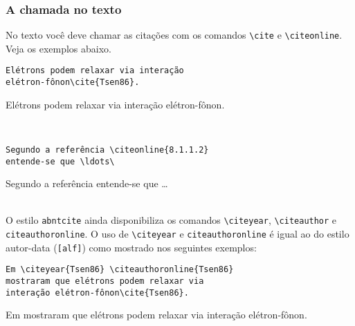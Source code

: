 \documentclass[espacosimples]{abnt}
\begin{document}
\subsubsection{A chamada no texto}

No texto você deve chamar as citações com os comandos \verb+\cite+ e
\verb+\citeonline+. Veja os exemplos abaixo.

\noindent\begin{minipage}[t]{10cm}\small
\begin{verbatim}
Elétrons podem relaxar via interação
elétron-fônon\cite{Tsen86}.
\end{verbatim}\end{minipage}\begin{minipage}[t]{7cm}\small
Elétrons podem relaxar via interação elétron-fônon\cite{Tsen86}.
\end{minipage}\vspace{5mm}\\

\noindent\begin{minipage}[t]{10cm}\small\begin{verbatim}
Segundo a referência \citeonline{8.1.1.2}
entende-se que \ldots\
\end{verbatim}\end{minipage}\begin{minipage}[t]{7cm}\small
Segundo  a referência 
entende-se que \ldots\
\end{minipage}\vspace{5mm}\\

O estilo {\tt abntcite} ainda disponibiliza os comandos \verb+\citeyear+,
\verb+\citeauthor+ e \verb+citeauthoronline+.
O uso de \verb+\citeyear+ e \verb+citeauthoronline+
é igual ao do estilo autor-data ({\tt [alf]}) como mostrado nos seguintes
exemplos:

\noindent\begin{minipage}[t]{10cm}\small\begin{verbatim}
Em \citeyear{Tsen86} \citeauthoronline{Tsen86}
mostraram que elétrons podem relaxar via 
interação elétron-fônon\cite{Tsen86}.
\end{verbatim}\end{minipage}\begin{minipage}[t]{7cm}\small
Em \citeyear{Tsen86} 
mostraram que elétrons podem relaxar via
interação elétron-fônon\cite{Tsen86}.
\end{minipage}\vspace{5mm}\\
\end{document}
